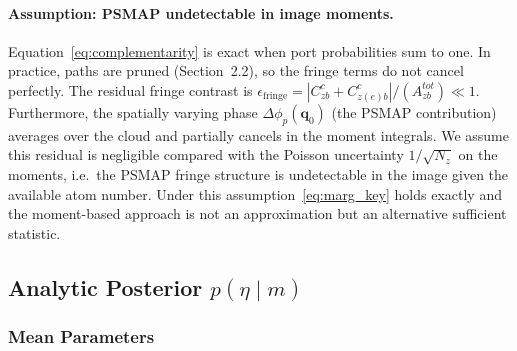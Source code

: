 \documentclass[11pt,a4paper]{article}
\newcommand{\q}{\mathbf{q}}
\begin{document}
\paragraph{Assumption: PSMAP undetectable in image moments.}
Equation~\eqref{eq:complementarity} is exact when port probabilities sum
to one.  In practice, paths are pruned (Section~2.2), so the fringe terms
do not cancel perfectly.  The residual fringe contrast is
$\epsilon_\mathrm{fringe} = |C^c_{zb}+C^c_{z(e)b}|/(A^{tot}_{zb}) \ll 1$.
Furthermore, the spatially varying phase $\Delta\phi_p(\q_0)$ (the PSMAP
contribution) averages over the cloud and partially cancels in the moment
integrals.  We assume this residual is negligible compared with the Poisson
uncertainty $1/\sqrt{N_z}$ on the moments, i.e.\ the PSMAP fringe structure
is undetectable in the image given the available atom number.
Under this assumption~\eqref{eq:marg_key} holds exactly and the
moment-based approach is not an approximation but an alternative sufficient
statistic.

\subsection{Analytic Posterior $p(\eta \mid m)$}

\subsubsection{Mean Parameters}
\end{document}
